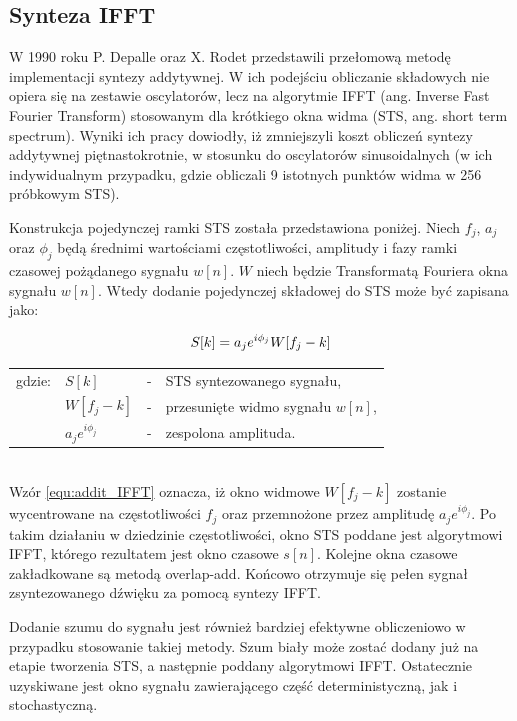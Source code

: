 \subsection{Synteza IFFT}
W 1990 roku P. Depalle oraz X. Rodet przedstawili przełomową metodę implementacji syntezy addytywnej. W ich podejściu obliczanie składowych nie opiera się na zestawie oscylatorów, lecz na algorytmie IFFT (ang. Inverse Fast Fourier Transform) stosowanym dla krótkiego okna widma (STS, ang. short term spectrum). Wyniki ich pracy dowiodły, iż zmniejszyli koszt obliczeń syntezy addytywnej piętnastokrotnie, w stosunku do oscylatorów sinusoidalnych (w ich indywidualnym przypadku, gdzie obliczali 9 istotnych punktów widma w 256 próbkowym STS).

Konstrukcja pojedynczej ramki STS została przedstawiona poniżej. Niech $f_{j}$, $a_{j}$ oraz $\phi_{j}$ będą średnimi wartościami częstotliwości, amplitudy i fazy ramki czasowej pożądanego sygnału $w[n]$. $W$ niech będzie Transformatą Fouriera okna sygnału $w[n]$. Wtedy dodanie pojedynczej składowej do STS może być zapisana jako:

\begin{equation} \label{equ:addit_IFFT}
S[k] = a_{j}e^{i\phi_{j}}W[f_{j} - k] \\  
\end{equation}
\begin{tabular}{ l l l l}
	gdzie: & $S[k]$ &  - & STS syntezowanego sygnału, \\
	& $W[f_{j} - k]$ &  - & przesunięte widmo sygnału $w[n]$, \\
	& $a_{j}e^{i\phi_{j}}$ & - & zespolona amplituda. \\
\end{tabular} \\

Wzór \ref{equ:addit_IFFT} oznacza, iż okno widmowe $W[f_{j} - k]$ zostanie wycentrowane na częstotliwości $f_{j}$ oraz przemnożone przez amplitudę $a_{j}e^{i\phi_{j}}$. Po takim działaniu w dziedzinie częstotliwości, okno STS poddane jest algorytmowi IFFT, którego rezultatem jest okno czasowe $s[n]$. Kolejne okna czasowe zakładkowane są metodą overlap-add. Końcowo otrzymuje się pełen sygnał zsyntezowanego dźwięku za pomocą syntezy IFFT.

Dodanie szumu do sygnału jest również bardziej efektywne obliczeniowo w przypadku stosowanie takiej metody. Szum biały może zostać dodany już na etapie tworzenia STS, a następnie poddany algorytmowi IFFT. Ostatecznie uzyskiwane jest okno sygnału zawierającego część deterministyczną, jak i stochastyczną.

